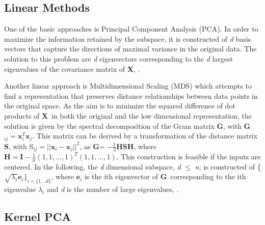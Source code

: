 \documentclass[a4paper,12pt]{article}
\newcommand{\mx}{\mathbf{x}}
\newcommand{\mS}{\mathbf{S}}
\newcommand{\mH}{\mathbf{H}}
\newcommand{\mI}{\mathbf{I}}
\newcommand{\X}{\textbf{X}}
\newcommand{\G}{\textbf{G}}
\newcommand{\mhalf}{\frac{1}{2}}
\begin{document}
\subsection{Linear Methods}
\label{sec:LinMet}
One of the basic approaches is Principal Component Analysis (PCA). In order to maximize the information retained by the subspace, it is constructed of \textit{d} basis vectors that capture the directions of maximal variance in the original data. The solution to this problem are \textit{d} eigenvectors corresponding to the \textit{d} largest eigenvalues of the covariance matrix of \X, \cite{Murphy2}.

Another linear approach is Multidimensional Scaling (MDS) which attempts to find a representation that preserves distance relationships between data points in the original space. As the aim is to minimize the squared difference of  dot products of \X \  in both the original and the low dimensional representation, the solution is given by the spectral decomposition of the Gram matrix \G, with \G$_{ij} = \mx_i^T \mx_j$. This matrix can be derived by a transformation of the distance matrix \textbf{S}, with 
S$_{ij} = || \mx_i - \mx_j || ^2$, as \G = $-\mhalf \mH\mS\mH$, where $ \mH  = \mI - \frac{1}{n}(1,1, ..., 1)^T(1,1, ..., 1)$. This construction is feasible if the inputs are centered. In the following, the \textit{d} dimensional subspace, \textit{d} $\leq$ \textit{n},  is constructed of \{$\sqrt{\lambda_i}\mathbf{e}_i\}_{i = \{1,..d\}}$, where $\mathbf{e}_i$ is the ith eigenvector of \G \ corresponding to the ith eigenvalue $\lambda_i$ and \textit{d} is the number of large eigenvalues, \cite{Williams}.

\subsection{Kernel PCA}
\end{document}
